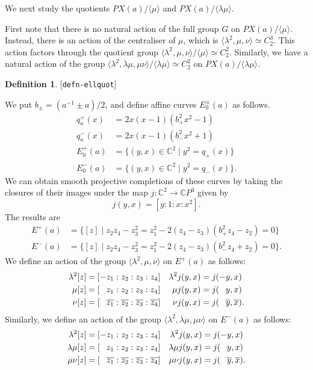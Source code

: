\documentclass[reqno]{amsart}
\newcommand{\lbl}[1]{\label{#1}\textup{[\texttt{#1}]}\par}
\newcommand{\lbl}{\label}
\newcommand{\lm}        {\lambda}
\newcommand{\C}         {{\mathbb{C}}}
\newcommand{\ov}[1]     {\overline{#1}}
\newcommand{\ip}[1]     {\langle #1\rangle}
\newcommand{\st}        {\;|\;}
\newcommand{\pp}        {\hphantom{+}}
\renewcommand{\:}{\colon}
\theoremstyle{definition}
\newtheorem{definition}[theorem]{Definition}
\begin{document}
We next study the quotients $PX(a)/\ip{\mu}$ and $PX(a)/\ip{\lm\mu}$.

First note that there is no natural action of the full group $G$ on
$PX(a)/\ip{\mu}$.  Instead, there is an action of the centraliser of
$\mu$, which is $\ip{\lm^2,\mu,\nu}\simeq C_2^3$.  This action factors
through the quotient group $\ip{\lm^2,\mu,\nu}/\ip{\mu}\simeq C_2^2$.
Similarly, we have a natural action of the group
$\ip{\lm^2,\lm\mu,\mu\nu}/\ip{\lm\mu}\simeq C_2^2$ on $PX(a)/\ip{\lm\mu}$.

\begin{definition}\lbl{defn-ellquot}
 We put $b_{\pm}=(a^{-1}\pm a)/2$, and define affine curves
 $E_0^{\pm}(a)$ as follows.
 \begin{align*}
  q^+_a(x) &= 2x(x-1)\left(b_+^2x^2-1\right) \\
  q^-_a(x) &= 2x(x-1)\left(b_-^2x^2+1\right) \\
  E^+_0(a) &= \{(y,x)\in\C^2\st y^2=q_+(x)\} \\
  E^-_0(a) &= \{(y,x)\in\C^2\st y^2=q_-(x)\}.
 \end{align*}
 We can obtain smooth projective completions of these curves by taking
 the closures of their images under the map $j\:\C^2\to\C P^3$ given
 by
 \[ j(y,x) = [y:1:x:x^2]. \]
 The results are
 \begin{align*}
  E^+(a) &=
   \{[z]\st z_2z_4-z_3^2 = z_1^2 - 2(z_4-z_3)(b_+^2z_4-z_2)=0\} \\
  E^-(a) &=
   \{[z]\st z_2z_4-z_3^2 = z_1^2 - 2(z_4-z_3)(b_-^2z_4+z_2)=0\}.
 \end{align*}
 We define an action of the group $\ip{\lm^2,\mu,\nu}$ on $E^+(a)$ as
 follows:
 \begin{align*}
  \lm^2[z] &= [   -z_1:z_2:z_3:z_4] & \lm^2j(y,x) &= j(   -y,x) \\
    \mu[z] &= [\pp z_1:z_2:z_3:z_4] &  \mu j(y,x) &= j(\pp y,x) \\
    \nu[z] &= [\pp \ov{z_1}:\ov{z_2}:\ov{z_3}:\ov{z_4}] &
    \nu j(y,x) &= j(\pp\ov{y},\ov{x}).
 \end{align*}
 Similarly, we define an action of the group
 $\ip{\lm^2,\lm\mu,\mu\nu}$ on $E^-(a)$ as follows:
 \begin{align*}
  \lm^2[z]  &= [   -z_1:z_2:z_3:z_4] & \lm^2j(y,x) &= j(   -y,x) \\
  \lm\mu[z] &= [\pp z_1:z_2:z_3:z_4] & \lm\mu j(y,x) &= j(\pp y,x) \\
  \mu\nu[z] &= [\pp \ov{z_1}:\ov{z_2}:\ov{z_3}:\ov{z_4}] &
  \mu\nu j(y,x) &= j(\pp\ov{y},\ov{x}).
 \end{align*}
\end{definition}
\end{document}
